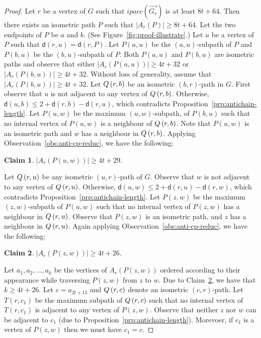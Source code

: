 \documentclass[a4paper]{article}
\newcommand{\dist}[2]{\mathsf{d}\left(#1,#2\right)}
\newcommand{\anticp}[2]{A_{#1}\left(#2\right)}
\newcommand{\ipac}[1]{ipacc\left(#1\right)}
\newcommand{\Pnote}[2]{P\left(#1,#2\right)}
\newtheorem{claim}{Claim}[theorem]
\begin{document}
\begin{proof}


Let $r$ be a vertex of $G$ such that $\ipac{\overrightarrow{G_r}}$ is at least $8t+64$. Then there exists an isometric path $P$ such that $|\anticp{r}{P}|\geq 8t+64$. Let the two endpoints of $P$ be $a$ and $b$. (See Figure~\ref{fig:proof-illustrate}.) Let $u$ be a vertex of $P$ such that $\dist{r}{u}=\dist{r}{P}$. Let $\Pnote{a}{u}$ be the $(a,u)$-subpath of $P$ and $\Pnote{b}{u}$ be the $(b,u)$-subpath of $P$. Both $\Pnote{a}{u}$ and $\Pnote{b}{u}$ are isometric paths and observe that either $|\anticp{r}{\Pnote{a}{u}}|\geq 4t+32$ or  $|\anticp{r}{\Pnote{b}{u}}|\geq 4t+32$. Without loss of generality, assume that  $|\anticp{r}{\Pnote{b}{u} }|\geq 4t+32$. Let $Q\left({r},{b}\right)$ be an isometric $(b,r)$-path in $G$. First observe that $u$ is not adjacent to any vertex of $Q\left({r},{b}\right)$. Otherwise, $\dist{u}{b} \leq 2 + \dist{r}{b}-\dist{r}{u}$, which contradicts Proposition~\ref{prp:antichain-length}. Let $\Pnote{u}{w}$ be the maximum $(u,w)$-subpath, of $\Pnote{b}{u}$ such that no internal vertex of $\Pnote{u}{w}$ is a neighbour of $Q\left({r},{b}\right)$. Note that $\Pnote{u}{w}$ is an isometric path and $w$ has a neighbour in $Q\left({r},{b}\right)$. Applying Observation~\ref{obs:anti-cp-reduc}, we have the following:

\begin{claim}
$|\anticp{r}{\Pnote{u}{w}}| \geq 4t+29$.
\end{claim}

Let $Q\left({r},{u}\right)$ be any isometric $(u,r)$-path of $G$. Observe that $w$ is not adjacent to any vertex of $Q\left({r},{u}\right)$. Otherwise, $\dist{u}{w} \leq 2 + \dist{r}{u}-\dist{r}{w}$, which contradicts Proposition~\ref{prp:antichain-length}.  Let $\Pnote{z}{w}$ be the maximum $(z,w)$-subpath of $\Pnote{u}{w}$ such that no internal vertex of $\Pnote{z}{w}$ has a neighbour in $Q\left({r},{u}\right)$. Observe that $\Pnote{z}{w}$ is an isometric path, and $z$ has a neighbour in $Q\left({r},{u}\right)$. Again applying Observation~\ref{obs:anti-cp-reduc}, we have the following:

\begin{claim}\label{cl:2}
$|\anticp{r}{\Pnote{z}{w}}| \geq 4t+26$.
\end{claim}


Let $a_1, a_2, \ldots,a_k$ be the vertices of $\anticp{r}{\Pnote{z}{w}}$ ordered according to their appearance while traversing $\Pnote{z}{w}$ from $z$ to $w$. Due to Claim~\ref{cl:2}, we have that $k\geq 4t+26$. Let $c=a_{2t+13}$ and $Q\left({r},{c}\right)$ denote an isometric $(c,r)$-path. Let $T(r,c_1)$ 
be the maximum subpath of $Q\left({r},{c}\right)$ such that no internal vertex of $T(r,c_1)$ is adjacent to any vertex of $\Pnote{z}{w}$. Observe that neither $z$ nor $w$ can be adjacent to $c_1$ (due to Proposition~\ref{prp:antichain-length}). Morevoer, if $c_1$ is a vertex of $\Pnote{z}{w}$ then we must have $c_1=c$.


\end{proof}
\end{document}
